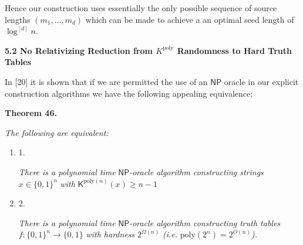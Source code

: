 \documentclass[10pt,a4paper]{article}
\begin{document}



Hence our construction uses essentially the only possible sequence of source lengths $(m_{1},\ldots,m_{d})$ which can be made to achieve a an optimal seed length of $\log^{[d]}n$.\par






\par\medskip\noindent\textbf{
5.2 No Relativizing Reduction from $K^{\mathrm{poly}}$ Randomness to Hard Truth Tables}\par




In [20] it is shown that if we are permitted the use of an ${\mathsf{NP}}$ oracle in our explicit construction algorithms we have the following appealing equivalence:\par





\par\medskip\noindent\textbf{
\textbf{Theorem 46}\textbf{.}
}\par



\emph{The following are equivalent:}\par


\begin{enumerate}


\item[] 
1. 


\emph{There is a polynomial time }${\mathsf{NP}}$\emph{-oracle algorithm constructing strings }$x\in\{0,1\}^{n}$\emph{ with }${\mathsf{K}}^{\mathrm{poly}(n)}(x)\geq n-1$\emph{}\par





\item[] 
2. 


\emph{There is a polynomial time }${\mathsf{NP}}$\emph{-oracle algorithm constructing truth tables }$f:\{0,1\}^{n}\to\{0,1\}$\emph{ with hardness }$2^{\Omega(n)}$\emph{ (i.e. }$\mathrm{poly}(2^{n})=2^{O(n)}$\emph{).}\par





\end{enumerate}
\end{document}
